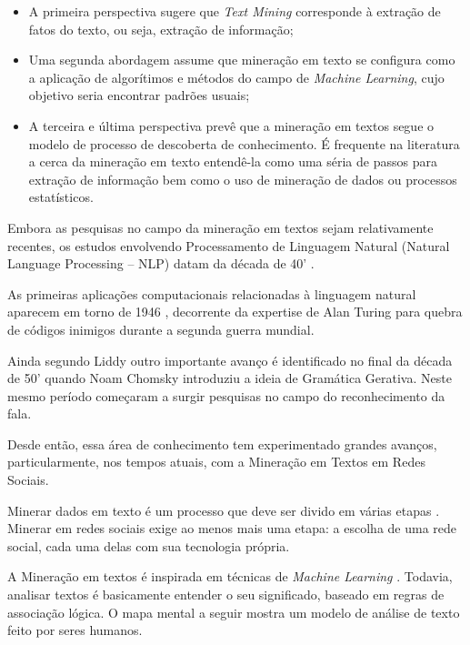 \begin{itemize}
	\item A primeira perspectiva sugere que \textit{Text Mining} corresponde à extração de fatos do texto, ou seja, extração de informação;
	\item Uma segunda abordagem assume que mineração em texto se configura como a aplicação de algorítimos e métodos do campo de \textit{Machine Learning}, cujo objetivo seria encontrar padrões usuais;
	\item A terceira e última perspectiva prevê que a mineração em textos segue o modelo de processo de descoberta de conhecimento. É frequente na literatura a cerca da mineração em texto entendê-la como uma séria de passos para extração de informação bem como o uso de mineração de dados ou processos estatísticos.
\end{itemize}

Embora as pesquisas no campo da mineração em textos sejam relativamente recentes, os estudos envolvendo Processamento de Linguagem Natural (Natural Language Processing -- NLP) datam da década de 40' \cite{liddy2001natural}. 

As primeiras aplicações computacionais relacionadas à linguagem natural aparecem em torno de 1946 \cite{liddy2001natural},  decorrente da expertise de Alan Turing para quebra de códigos inimigos durante a segunda guerra mundial. 

Ainda segundo Liddy \cite{liddy2001natural} outro importante avanço é identificado no final da década de 50' quando Noam Chomsky introduziu a ideia de Gramática Gerativa. Neste mesmo período começaram a surgir pesquisas no campo do reconhecimento da fala. 

Desde então, essa área de conhecimento tem experimentado grandes avanços, particularmente, nos tempos atuais, com a Mineração em Textos em Redes Sociais.

Minerar dados em texto é um processo que deve ser divido em várias etapas \cite{Lima2012}. Minerar em redes sociais exige ao menos mais uma etapa: a escolha de uma rede social, cada uma delas com sua tecnologia própria.

A Mineração em textos é inspirada em técnicas de \textit{Machine Learning} \cite{Aranha2006}. Todavia, analisar textos é basicamente entender o seu significado, baseado em regras de associação lógica. O mapa mental a seguir mostra um modelo de análise de texto feito por seres humanos.

